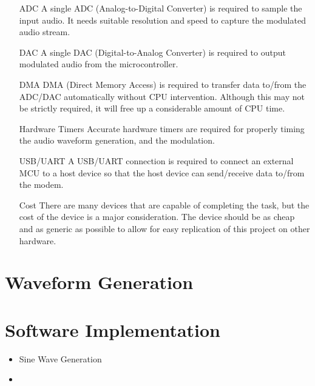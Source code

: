 \documentclass{journal}
\begin{document}
\begin{itemize}
  \item[ADC] A single ADC (Analog-to-Digital Converter) is required to sample the input audio. It needs suitable resolution and speed to capture the modulated audio stream.
  \item[DAC] A single DAC (Digital-to-Analog Converter) is required to output modulated audio from the microcontroller.
  \item[DMA] DMA (Direct Memory Access) is required to transfer data to/from the ADC/DAC automatically without CPU intervention. Although this may not be strictly required, it will free up a considerable amount of CPU time.
  \item[Hardware Timers] Accurate hardware timers are required for properly timing the audio waveform generation, and the modulation.
  \item[USB/UART] A USB/UART connection is required to connect an external MCU to a host device so that the host device can send/receive data to/from the modem.
  \item[Cost] There are many devices that are capable of completing the task, but the cost of the device is a major consideration. The device should be as cheap and as generic as possible to allow for easy replication of this project on other hardware.
\end{itemize}


\section{Waveform Generation}


\section{Software Implementation}
\begin{itemize}
  \item Sine Wave Generation
  \item 
\end{itemize}
\end{document}
